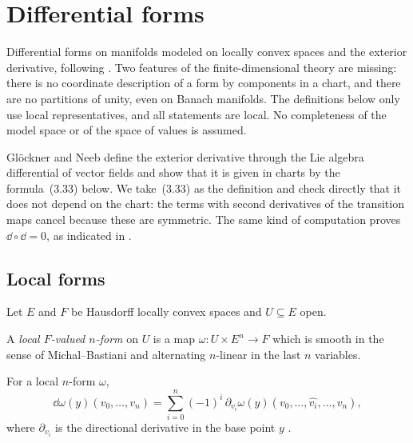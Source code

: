 \chapter{Differential forms}
\label{chap:forms}

Differential forms on manifolds modeled on locally convex spaces and the exterior derivative,
following \cite[Section~3.6]{GN26}. Two features of the finite-dimensional theory are missing:
there is no coordinate description of a form by components in a chart, and there are no
partitions of unity, even on Banach manifolds. The definitions below only use local
representatives, and all statements are local. No completeness of the model space or of the
space of values is assumed.

Glöckner and Neeb define the exterior derivative through the Lie algebra differential of vector
fields \cite[Proposition~3.6.7, formula~(3.29)]{GN26} and show that it is given in charts by the
formula~(3.33) below. We take~(3.33) as the definition and check directly that it does not depend
on the chart: the terms with second derivatives of the transition maps cancel because these are
symmetric. The same kind of computation proves $\dd \circ \dd = 0$, as indicated in
\cite[Remark~3.6.10]{GN26}.


\section{Local forms}

Let $E$ and $F$ be Hausdorff locally convex spaces and $U \subseteq E$ open.

\begin{definition}
  \label{def:local-form}
  \leanok
  A \emph{local $F$-valued $n$-form} on $U$ is a map $\omega \colon U \times E^n \to F$ which is
  smooth in the sense of Michal--Bastiani and alternating $n$-linear in the last $n$ variables.
\end{definition}

\begin{definition}
  \label{def:local-d}
  \leanok
  For a local $n$-form $\omega$,
  \[
    \dd\omega(y)(v_0, \dots, v_n) =
      \sum_{i=0}^{n} (-1)^i \, \partial_{v_i} \omega(y)(v_0, \dots, \widehat{v_i}, \dots, v_n),
  \]
  where $\partial_{v_i}$ is the directional derivative in the base point $y$
  \cite[(3.33)]{GN26}.
\end{definition}

